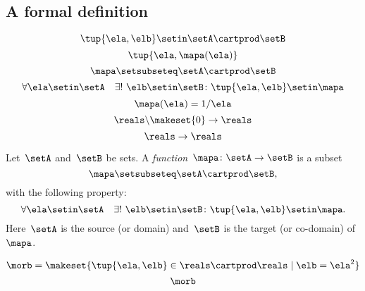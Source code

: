 \begin{forslides}
\subsection{A formal definition}

\begin{equation}\label{eq:slides_session2_107}
\tup{\ela, \elb} \setin\setA \cartprod \setB
\end{equation}
\begin{equation}\label{eq:slides_session2_108}
\tup{\ela, \mapa(\ela)}
\end{equation}
\begin{equation}\label{eq:slides_session2_109}
\mapa \setsubseteq \setA \cartprod \setB
\end{equation}
\begin{equation}\label{eq:slides_session2_110}
\forall \ela \setin\setA  \quad  \exists !
        \ \elb \setin\setB \colon \tup{\ela,\elb} \setin\mapa
\end{equation}
\begin{equation}\label{eq:slides_session2_111}
\mapa(\ela) = 1/ \ela
\end{equation}
\begin{equation}\label{eq:slides_session2_112}
\reals \backslash \makeset{ 0 } \to \reals
\end{equation}
\begin{equation}\label{eq:slides_session2_113}
\reals \to \reals
\end{equation}

\begin{ctdefinition}[Function]
    \label{def:function}
    Let~$\setA$ and~$\setB$ be sets.
    A \emph{function}~$\mapa\colon \setA \to \setB$ is a subset
    \begin{equation*}
        \mapa \setsubseteq \setA \cartprod \setB,
    \end{equation*}
    with the following property:
    \begin{equation*}
        \label{eq:function-determinism}
        \forall \ela \setin\setA  \quad  \exists !
        \ \elb \setin\setB \colon \tup{\ela,\elb} \setin\mapa.
    \end{equation*}
    Here~$\setA$ is the source (or domain) and~$\setB$ is the target (or co-domain) of~$\mapa$.
\end{ctdefinition}

\begin{equation}\label{eq:slides_session2_113a}
\morb = \makeset{\tup{\ela, \elb} \in \reals \cartprod \reals \mid \elb = \ela^2}
\end{equation}
\begin{equation}\label{eq:slides_session2_113b}
\morb
\end{equation}




\end{forslides}
